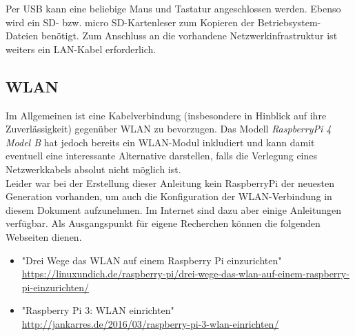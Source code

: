 Per USB kann eine beliebige Maus und Tastatur angeschlossen werden. 
Ebenso wird ein SD- bzw. micro SD-Kartenleser zum Kopieren der Betriebsystem-Dateien benötigt. 
Zum Anschluss an die vorhandene Netzwerkinfrastruktur ist weiters ein LAN-Kabel erforderlich.

\subsection{WLAN}
\label{sec:rpiwlan}

Im Allgemeinen ist eine Kabelverbindung (insbesondere in Hinblick auf ihre Zuverlässigkeit) gegenüber WLAN zu bevorzugen. 
Das Modell \textit{RaspberryPi 4 Model B} hat jedoch bereits ein WLAN-Modul inkludiert und kann damit eventuell eine interessante Alternative darstellen, falls die Verlegung eines Netzwerkkabels absolut nicht möglich ist.\\
Leider war bei der Erstellung dieser Anleitung kein RaspberryPi der neuesten Generation vorhanden, um auch die Konfiguration der WLAN-Verbindung in diesem Dokument aufzunehmen. Im Internet sind dazu aber einige Anleitungen verfügbar.
Als Ausgangspunkt für eigene Recherchen können die folgenden Webseiten dienen.

\begin{itemize}
	\item "Drei Wege das WLAN auf einem Raspberry Pi einzurichten"\\
		\url{https://linuxundich.de/raspberry-pi/drei-wege-das-wlan-auf-einem-raspberry-pi-einzurichten/}
	\item "Raspberry Pi 3: WLAN einrichten"\\
		\url{http://jankarres.de/2016/03/raspberry-pi-3-wlan-einrichten/}
\end{itemize}



